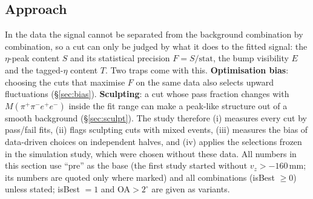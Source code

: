 \documentclass[11pt,a4paper]{article}
\newcommand{\Mfour}{\ensuremath{M(\pi^{+}\pi^{-}e^{+}e^{-})}\xspace}
\newcommand{\vz}{\ensuremath{v_z}\xspace}
\begin{document}
\subsection{Approach}
\label{sec:optapproach}
In the data the signal cannot be separated from the background combination by combination, so a cut can only be judged by
what it does to the fitted signal: the $\eta$-peak content $S$ and its statistical precision $F=S/\mathrm{stat}$,
the bump visibility $E$ and the tagged-$\eta$ content $T$. Two traps come with this. \textbf{Optimisation
bias}: choosing the cuts that maximise $F$ on the same data also selects upward fluctuations (\S\ref{sec:bias}).
\textbf{Sculpting}: a cut whose pass fraction changes with \Mfour inside the fit range can make a peak-like
structure out of a smooth background (\S\ref{sec:sculpt}). The study therefore (i) measures every cut by
pass/fail fits, (ii) flags sculpting cuts with mixed events, (iii) measures the bias of data-driven choices
on independent halves, and (iv) applies the selections frozen in the simulation study, which were chosen
without these data. All numbers in this section use ``pre'' as the base (the first study started without
$\vz>-160$\,mm; its numbers are quoted only where marked) and all combinations (isBest $\ge0$) unless stated;
isBest $=1$ and OA$>2^\circ$ are given as variants.
\end{document}
